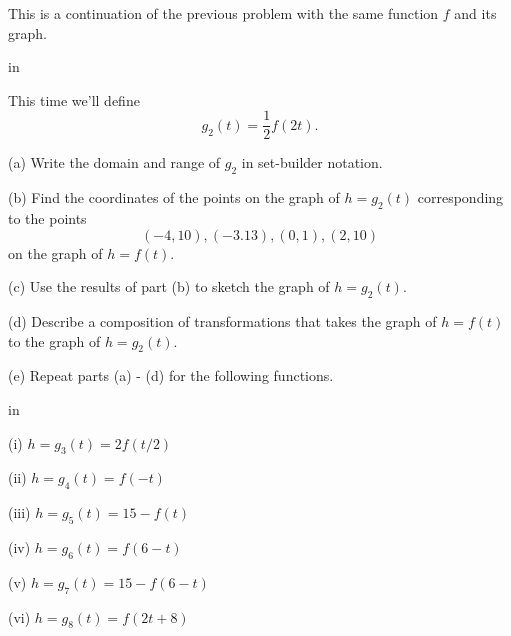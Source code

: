 \documentclass{ximera}
\newcommand{\pskip}{\vskip 0.1 in}
\begin{document}
\begin{question}  \label{Q:vvvcccc}
This is a continuation of the previous problem with the same function $f$ and its graph.

\pskip

This time we'll define 
\[
     g_2(t) = \frac{1}{2}f(2t) .
\]

(a) Write the domain and range of $g_2$ in set-builder notation.

(b) Find the coordinates of the points on the graph of $h=g_2(t)$ corresponding to the points
\[
    (-4,10), (-3.13), (0,1), (2,10)
\]
on the graph of $h=f(t)$.

(c) Use the results of part (b) to sketch the graph of $h=g_2(t)$.

(d) Describe a composition of transformations that takes the graph of $h=f(t)$ to the graph of $h=g_2(t)$.

(e) Repeat parts (a) - (d) for the following functions.

\pskip


(i)  $h=g_3(t) = 2f(t/2)$

(ii) $h = g_4(t) = f(-t)$

(iii) $h = g_5(t) = 15 - f(t)$

(iv) $h = g_6(t) = f(6-t)$

(v) $h = g_7(t) = 15 - f(6-t)$

(vi) $h=g_8(t) = f(2t+8)$



\end{question}
\end{document}
